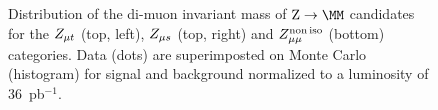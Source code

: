\begin{figure}[hbtp]
\begin{center}
\begin{minipage}{73mm}
\begin{center}
       \end{center}
     \end{minipage}
   \end{center}
\caption{Distribution of the di-muon invariant mass of $\Zmm$ candidates for 
  the  $Z_{\mu t}$ (top, left), $Z_{\mu s}$ (top, right) and $Z_{\mu\mu}^{\mathrm{non\,iso}}$ (bottom) categories.
  Data (dots) are superimposted on Monte Carlo (histogram) for signal and background normalized
to a luminosity of 36~pb$^{-1}$.}
\label{fig:zNoGold}
\end{figure} 


